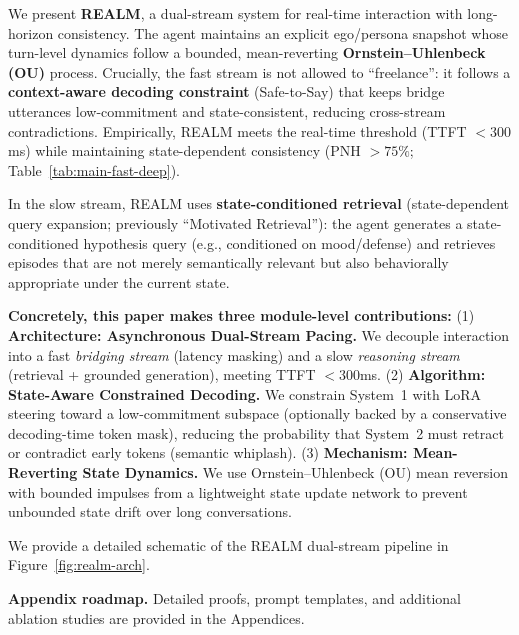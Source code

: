 \documentclass{article}
\begin{document}
We present \textbf{REALM}, a dual-stream system for real-time interaction with long-horizon consistency.
The agent maintains an explicit ego/persona snapshot whose turn-level dynamics follow a bounded, mean-reverting \textbf{Ornstein--Uhlenbeck (OU)} process.
Crucially, the fast stream is not allowed to ``freelance'': it follows a \textbf{context-aware decoding constraint} (Safe-to-Say) that keeps bridge utterances low-commitment and state-consistent, reducing cross-stream contradictions.
Empirically, REALM meets the real-time threshold (TTFT $<300$ms) while maintaining state-dependent consistency (PNH $>75\%$; Table~\ref{tab:main-fast-deep}).

In the slow stream, REALM uses \textbf{state-conditioned retrieval} (state-dependent query expansion; previously ``Motivated Retrieval''): the agent generates a state-conditioned hypothesis query (e.g., conditioned on mood/defense) and retrieves episodes that are not merely semantically relevant but also behaviorally appropriate under the current state.

\textbf{Concretely, this paper makes three module-level contributions:}
(1) \textbf{Architecture: Asynchronous Dual-Stream Pacing.} We decouple interaction into a fast \emph{bridging stream} (latency masking) and a slow \emph{reasoning stream} (retrieval + grounded generation), meeting TTFT $<300$ms.
(2) \textbf{Algorithm: State-Aware Constrained Decoding.} We constrain System~1 with LoRA steering toward a low-commitment subspace (optionally backed by a conservative decoding-time token mask), reducing the probability that System~2 must retract or contradict early tokens (semantic whiplash).
(3) \textbf{Mechanism: Mean-Reverting State Dynamics.} We use Ornstein--Uhlenbeck (OU) mean reversion with bounded impulses from a lightweight state update network to prevent unbounded state drift over long conversations.

We provide a detailed schematic of the REALM dual-stream pipeline in Figure~\ref{fig:realm-arch}.

\noindent\textbf{Appendix roadmap.} Detailed proofs, prompt templates, and additional ablation studies are provided in the Appendices.
\end{document}
